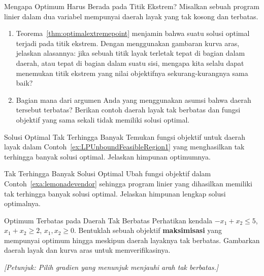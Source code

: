 
\begin{ex}{Mengapa Optimum Harus Berada pada Titik Ekstrem?}{}\label{ex:why-vertex}
Misalkan sebuah program linier dalam dua variabel mempunyai daerah layak yang tak kosong dan terbatas.
\begin{enumerate}
\item Teorema~\ref{thm:optimalextremepoint} menjamin bahwa suatu solusi optimal terjadi pada titik ekstrem. Dengan menggunakan gambaran kurva aras, jelaskan alasannya: jika sebuah titik layak terletak tepat di bagian dalam daerah, atau tepat di bagian dalam suatu sisi, mengapa kita selalu dapat menemukan titik ekstrem yang nilai objektifnya sekurang-kurangnya sama baik?
\item Bagian mana dari argumen Anda yang menggunakan asumsi bahwa daerah tersebut terbatas? Berikan contoh daerah layak tak berbatas dan fungsi objektif yang sama sekali tidak memiliki solusi optimal.
\end{enumerate}
\end{ex}

\begin{ex}{Solusi Optimal Tak Terhingga Banyak}{}
Temukan fungsi objektif untuk daerah layak dalam Contoh~\ref{ex:LPUnboundFeasibleRegion1} yang menghasilkan tak terhingga banyak solusi optimal. Jelaskan himpunan optimumnya.
\exrefs{\S\ref{sec:infinitely-many-optima}}
\end{ex}

\begin{ex}{Tak Terhingga Banyak Solusi Optimal}{}
Ubah fungsi objektif dalam Contoh~\ref{exa:lemonadevendor} sehingga program linier yang dihasilkan memiliki tak terhingga banyak solusi optimal. Jelaskan himpunan lengkap solusi optimalnya.
\end{ex}

\begin{ex}{Optimum Terbatas pada Daerah Tak Berbatas}{}
Perhatikan kendala $-x_1+x_2\leq 5$, $x_1+x_2\geq 2$, $x_1,x_2\geq 0$. Bentuklah sebuah objektif \textbf{maksimisasi} yang mempunyai optimum hingga meskipun daerah layaknya tak berbatas. Gambarkan daerah layak dan kurva aras untuk memverifikasinya.

\emph{[Petunjuk: Pilih gradien yang menunjuk menjauhi arah tak berbatas.]}
\end{ex}

